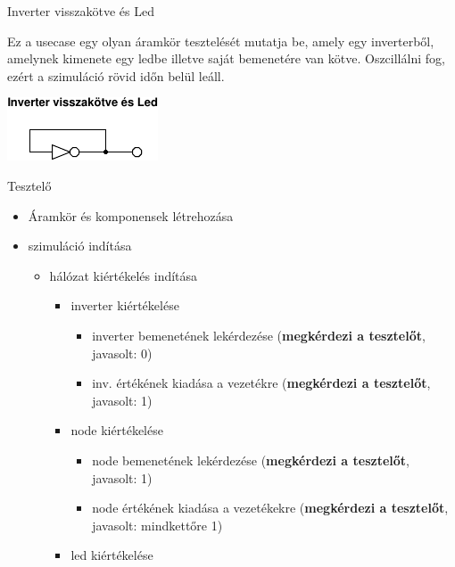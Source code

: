 \usecase
{Inverter visszakötve és Led}
{Ez a usecase egy olyan áramkör tesztelését mutatja be, amely egy inverterből, amelynek kimenete egy ledbe illetve saját bemenetére van kötve. Oszcillálni fog, ezért a szimuláció rövid időn belül leáll.
\newline
\begin{center}
\vspace{-15pt}
\includegraphics[scale=1.5]{dw/circuit_test4.pdf}
\vspace{-10pt}
\end{center}}
{Tesztelő}
{\vspace{-10pt}
\begin{itemize}
\setlength{\itemsep}{0cm}%
\setlength{\parskip}{0cm}%
\setlength{\itemindent}{-15pt}%
\item Áramkör és komponensek létrehozása
\item szimuláció indítása
\begin{itemize}
\setlength{\itemsep}{0cm}%
\setlength{\parskip}{0cm}%
\setlength{\itemindent}{-35pt}%
\item hálózat kiértékelés indítása
\begin{itemize}
\setlength{\itemsep}{0cm}%
\setlength{\parskip}{0cm}%
\setlength{\itemindent}{-50pt}%
	\item inverter kiértékelése
	\begin{itemize}
	\setlength{\itemsep}{0cm}%
	\setlength{\parskip}{0cm}%
	\setlength{\itemindent}{-65pt}%
		\item inverter bemenetének lekérdezése (\textbf{megkérdezi a tesztelőt}, javasolt: 0)
		\item inv. értékének kiadása a vezetékre (\textbf{megkérdezi a tesztelőt}, javasolt: 1)
	\end{itemize}
	\item node kiértékelése
	\begin{itemize}
	\setlength{\itemsep}{0cm}%
	\setlength{\parskip}{0cm}%
	\setlength{\itemindent}{-65pt}%
		\item node bemenetének lekérdezése (\textbf{megkérdezi a tesztelőt}, javasolt: 1)
		\item node értékének kiadása a vezetékekre (\textbf{megkérdezi a tesztelőt}, javasolt: mindkettőre 1)
	\end{itemize}
	\item led kiértékelése

\end{itemize}
\end{itemize}
\end{itemize}}
